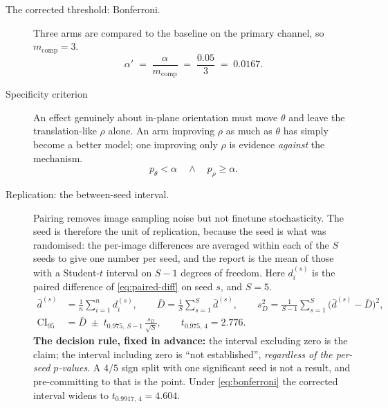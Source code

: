 \documentclass[final_report.tex]{subfiles}
\begin{document}
\begin{description}
\item[The corrected threshold: Bonferroni.] Three arms are compared to the baseline on
the primary channel, so $m_{\text{comp}} = 3$.
\begin{equation}\label{eq:bonferroni}
  \alpha' \;=\; \frac{\alpha}{m_{\text{comp}}} \;=\; \frac{0.05}{3} \;=\; 0.0167 .
\end{equation}

\item[Specificity criterion] An effect genuinely about
in-plane orientation must move $\theta$ and leave the translation-like $\rho$ alone. An arm
improving $\rho$ as much as $\theta$ has simply become a better model; one improving only
$\rho$ is evidence \emph{against} the mechanism.
\begin{equation}\label{eq:specificity}
  p_\theta < \alpha
  \quad\wedge\quad
  p_\rho \geq \alpha .
\end{equation}

\item[Replication: the between-seed interval.] Pairing removes image sampling noise but
not finetune stochasticity. The seed is therefore the unit of replication, because the
seed is what was randomised: the per-image differences are averaged within each of the $S$
seeds to give one number per seed, and the report is the mean of those with a Student-$t$
interval on $S - 1$ degrees of freedom. Here $d^{(s)}_i$ is the paired difference of
\cref{eq:paired-diff} on seed $s$, and $S = 5$.
\begin{align}
  \bar d^{(s)} &= \frac{1}{n}\sum_{i=1}^{n} d^{(s)}_i ,
  \qquad
  \bar D = \frac{1}{S}\sum_{s=1}^{S} \bar d^{(s)} ,
  \qquad
  s_D^2 = \frac{1}{S-1}\sum_{s=1}^{S}\bigl(\bar d^{(s)} - \bar D\bigr)^2 ,
  \label{eq:between-seed-mean}\\[2pt]
  \mathrm{CI}_{95} &= \bar D \;\pm\; t_{0.975,\,S-1}\,\frac{s_D}{\sqrt{S}} ,
  \qquad t_{0.975,\,4} = 2.776 .
  \label{eq:between-seed}
\end{align}
\textbf{The decision rule, fixed in advance:} the interval excluding zero is the claim; the
interval including zero is ``not established'', \emph{regardless of the per-seed
$p$-values}. A $4/5$ sign split with one significant seed is not a result, and pre-committing
to that is the point. Under \cref{eq:bonferroni} the corrected interval widens to
$t_{0.9917,\,4} = 4.604$. 

\end{description}
\end{document}
